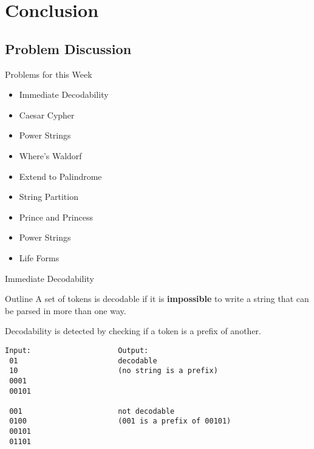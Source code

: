 \section{Conclusion}

\subsection{Problem Discussion}

\begin{frame}{Problems for this Week}

  \begin{itemize}
  \item Immediate Decodability
  \item Caesar Cypher
  \item Power Strings
  \item Where's Waldorf
  \item Extend to Palindrome
  \item String Partition
  \item Prince and Princess
  \item Power Strings
  \item Life Forms
  \end{itemize}

\end{frame}

\begin{frame}[fragile]{Immediate Decodability}
  \begin{block}{Outline}
    A set of tokens is decodable if it is {\bf impossible} to write a string that can be parsed in more than one way.\bigskip

    Decodability is detected by checking if a token is a prefix of another.
  \end{block}
\begin{verbatim}
Input:                    Output:
 01                       decodable
 10                       (no string is a prefix)
 0001
 00101

 001                      not decodable
 0100                     (001 is a prefix of 00101)
 00101
 01101
\end{verbatim}
\end{frame}

